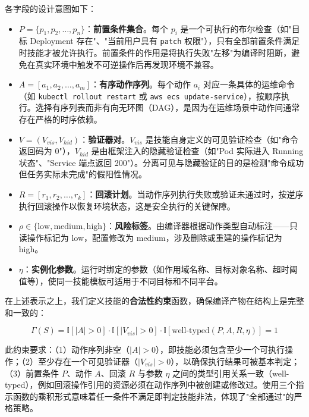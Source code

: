 \documentclass[11pt,a4paper]{ctexart}
\begin{document}
\noindent 各字段的设计意图如下：
\begin{itemize}[leftmargin=2em]
  \item $P = \{p_1, p_2, \ldots, p_n\}$：\textbf{前置条件集合}。每个 $p_i$ 是一个可执行的布尔检查（如"目标 Deployment 存在"、"当前用户具有 \texttt{patch} 权限"），只有全部前置条件满足时技能才被允许执行。前置条件的作用是将执行失败"左移"为编译时阻断，避免在真实环境中触发不可逆操作后再发现环境不兼容。
  \item $A = [a_1, a_2, \ldots, a_m]$：\textbf{有序动作序列}。每个动作 $a_i$ 对应一条具体的运维命令（如 \texttt{kubectl rollout restart} 或 \texttt{aws ecs update-service}），按顺序执行。选择有序列表而非有向无环图（DAG），是因为在运维场景中动作间通常存在严格的时序依赖。
  \item $V = (V_{vis}, V_{hid})$：\textbf{验证器对}。$V_{vis}$ 是技能自身定义的可见验证检查（如"命令返回码为 0"），$V_{hid}$ 是由框架注入的隐藏验证检查（如"Pod 实际进入 Running 状态"、"Service 端点返回 200"）。分离可见与隐藏验证的目的是检测"命令成功但任务实际未完成"的假阳性情况。
  \item $R = [r_1, r_2, \ldots, r_k]$：\textbf{回滚计划}。当动作序列执行失败或验证未通过时，按逆序执行回滚操作以恢复环境状态，这是安全执行的关键保障。
  \item $\rho \in \{\text{low}, \text{medium}, \text{high}\}$：\textbf{风险标签}。由编译器根据动作类型自动标注——只读操作标记为 low，配置修改为 medium，涉及删除或重建的操作标记为 high。
  \item $\eta$：\textbf{实例化参数}。运行时绑定的参数（如作用域名称、目标对象名称、超时阈值等），使同一技能模板可适用于不同目标和不同平台。
\end{itemize}

\noindent 在上述表示之上，我们定义技能的\textbf{合法性约束}函数，确保编译产物在结构上是完整和一致的：

\begin{equation}
\Gamma(S) = \mathbb{I}[|A| > 0] \cdot \mathbb{I}[|V_{vis}| > 0] \cdot \mathbb{I}[\text{well-typed}(P,A,R,\eta)] = 1
\end{equation}

\noindent 此约束要求：（1）动作序列非空（$|A| > 0$），即技能必须包含至少一个可执行操作；（2）至少存在一个可见验证器（$|V_{vis}| > 0$），以确保执行结果可被基本判定；（3）前置条件 $P$、动作 $A$、回滚 $R$ 与参数 $\eta$ 之间的类型引用关系一致（well-typed），例如回滚操作引用的资源必须在动作序列中被创建或修改过。使用三个指示函数的乘积形式意味着任一条件不满足即判定技能非法，体现了"全部通过"的严格策略。
\end{document}
